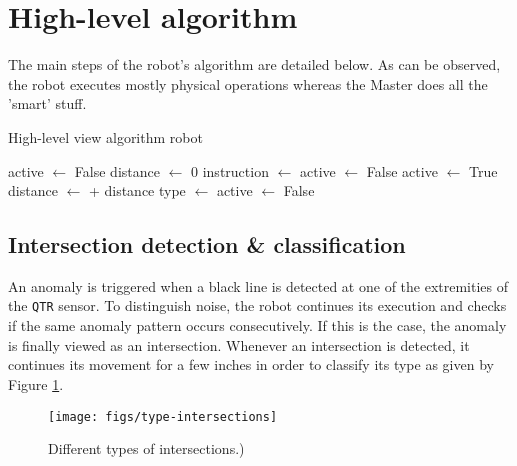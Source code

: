 \documentclass[12pt]{report}
\begin{document}
\section{High-level algorithm}\label{sec:high-algo}
The main steps of the robot's algorithm are detailed below. As can be observed, the robot executes mostly physical operations whereas the Master does all the 'smart' stuff.

\begin{algorithm}
    \caption{High-level view algorithm robot}
    \label{euclid}
    \begin{algorithmic}[1] %
    			\State active $\gets$ False
    			\State distance $\gets$ 0
					\State instruction $\gets$   
						\State \Call{stopMotors}{}
						\State active $\gets$ False
					\Else
						\State {} 
						\State active $\gets$ True
					\EndIf
				\EndIf
					\State {}
					\State distance $\gets$  + distance
					 
						\State type $\gets$  
						\State {} 
						\State {} 
						\State active $\gets$ False
					\EndIf
				\EndIf
				\State {} 
			 \EndWhile        		
        \EndProcedure
    \end{algorithmic}
\end{algorithm}

\subsection*{Intersection detection \& classification}
An anomaly is triggered when a black line is detected at one of the extremities of the \texttt{QTR} sensor. To distinguish noise, the robot continues its execution and checks if the same anomaly pattern occurs consecutively. If this is the case, the anomaly is finally viewed as an intersection. Whenever an intersection is detected, it continues its movement for a few inches in order to classify its type as given by Figure \ref{fig:types}.

\begin{figure}[!h]
\centering
\texttt{[image: figs/type-intersections]}
\caption{Different types of intersections.)}
\label{fig:types}
\end{figure}
\end{document}
